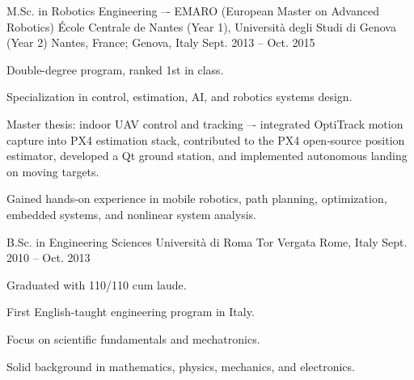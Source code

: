


\begin{cventries}

  \cventry
    {M.Sc. in Robotics Engineering –- EMARO (European Master on Advanced Robotics)} %
    {École Centrale de Nantes (Year 1), Università degli Studi di Genova (Year 2)} %
    {Nantes, France; Genova, Italy} %
    {Sept. 2013 -- Oct. 2015} %
    {
      \begin{cvitems}
        \item {Double-degree program, ranked 1st in class.}
        \item {Specialization in control, estimation, AI, and robotics systems design.}
        \item {Master thesis: indoor UAV control and tracking –- integrated OptiTrack motion capture into PX4 estimation stack, contributed to the PX4 open‑source position estimator, developed a Qt ground station, and implemented autonomous landing on moving targets.}
      \end{cvitems}
      \begin{cvparagraph}
        Gained hands-on experience in mobile robotics, path planning, optimization, embedded systems, and nonlinear system analysis.
      \end{cvparagraph}
    }

  \cventry
    {B.Sc. in Engineering Sciences} %
    {Università di Roma Tor Vergata} %
    {Rome, Italy} %
    {Sept. 2010 -- Oct. 2013} %
    {
      \begin{cvitems}
        \item {Graduated with 110/110 cum laude.}
        \item {First English-taught engineering program in Italy.}
        \item {Focus on scientific fundamentals and mechatronics.}
      \end{cvitems}
      \begin{cvparagraph}
        Solid background in mathematics, physics, mechanics, and electronics.
      \end{cvparagraph}
    }

\end{cventries}

